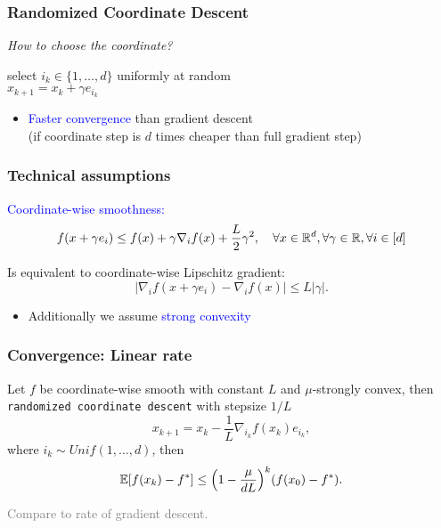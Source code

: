 \documentclass[aspectratio=149]{beamer}
\begin{document}
\begin{frame}
  \frametitle{Randomized Coordinate Descent}

  \textit{How to choose the coordinate?}

  \begin{block}{}
    \begin{center}
      select $i_k \in \{1, \dots, d\}$ uniformly at random\\
      $x_{k+1} = x_k + \gamma e_{i_k}$
    \end{center}
  \end{block}
  \vspace{1cm}
  \begin{itemize}
    \item \textcolor{blue}{Faster convergence} than gradient descent\\
          (if coordinate step is $d$ times cheaper than full gradient step)
  \end{itemize}
\end{frame}

\begin{frame}
  \frametitle{Technical assumptions}

  \begin{block}{}
    \textcolor{blue}{Coordinate-wise smoothness:}
    \begin{equation}
      f(x + \gamma e_i) \le f(x) + \gamma \nabla_i f(x) + \frac{L}{2}\gamma^2, \quad \forall x \in \mathbb{R}^d, \forall \gamma \in \mathbb{R}, \forall i \in [d]
    \end{equation}
  \end{block}
  Is equivalent to coordinate-wise Lipschitz gradient:
  \begin{equation}
    \vert \nabla_i f(x+ \gamma e_i) - \nabla_i f(x) \vert \le L \vert \gamma \vert.
  \end{equation}

  \begin{itemize}
    \item Additionally we assume \textcolor{blue}{strong convexity}
  \end{itemize}
\end{frame}

\begin{frame}
  \frametitle{Convergence: Linear rate}
  \begin{theorem}
    \label{thm:}
    Let $f$ be coordinate-wise smooth with constant $L$ and $\mu$-strongly convex, then \colorbox{gray!30}{\textup{\texttt{randomized coordinate descent}}} with stepsize $1/L$
    \begin{equation}
      x_{k+1} = x_k - \frac{1}{L} \nabla_{i_k} f(x_k) e_{i_k},
    \end{equation}
    where $i_k \sim Unif(1, \dots, d)$, then
    \begin{equation}
      \mathbb{E} [f(x_k)- f^*] \le {\left(1 - \frac{\mu}{d L}\right)}^k (f(x_0)-f^*).
    \end{equation}
  \end{theorem}
  \textcolor{gray}{Compare to rate of gradient descent.}
\end{frame}
\end{document}
